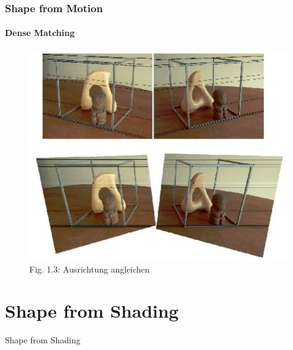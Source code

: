 \documentclass{beamer}
\begin{document}
\begin{frame}
	\frametitle{Shape from Motion}
	\framesubtitle{Dense Matching}

	\begin{figure}
		\includegraphics[width=0.8\linewidth]{includes/dense-matching}\\
		{\scriptsize Fig. 1.3: Ausrichtung angleichen}
	\end{figure}
\end{frame}


\section{Shape from Shading}

\begin{frame}	
	\center	\huge Shape from Shading
\end{frame}
\end{document}
